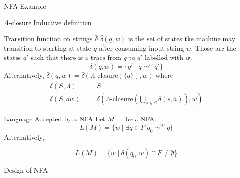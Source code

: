 \documentclass{beamer}
\begin{document}
\begin{frame}{NFA Example}

\end{frame}

\begin{frame}{$\Lambda$-closure}
Inductive definition
\end{frame}

\begin{frame}{Transition function on strings $\bar{\delta}$}
$\bar{\delta}(q,w)$ is the set of states the machine 
may transition to starting at state $q$ after consuming input string $w$.
Those are the states $q'$ such that there is a trace from $q$ to $q'$ labelled with $w$. 
\[ \bar{\delta}(q,w) =\{q' \mid q\leadsto^{w} q'\}
\] 
Alternatively, \(\bar{\delta}(q,w) = \bar{\delta}(\Lambda\mbox{-closure}(\{q\}),w)\) where
\begin{eqnarray*}
\bar{\delta}(S,\Lambda) &=& S \\ 
\bar{\delta}(S,aw) &=&  \bar{\delta}(\Lambda\mbox{-closure}(\bigcup_{s\in S}\delta(s,a)),w)
\end{eqnarray*}
\end{frame}

\begin{frame}{Language Accepted by a NFA}
Let $M=$ be a NFA. 
\[L(M) = \{w \mid \exists q\in F. q_0\leadsto^{W} q\}\]
Alternatively, 

\[ L(M) = \{w \mid \bar{\delta}(q_0,w) \cap F\neq\emptyset\}\]

\end{frame}

\begin{frame}{Design of NFA}

\end{frame}
\end{document}
